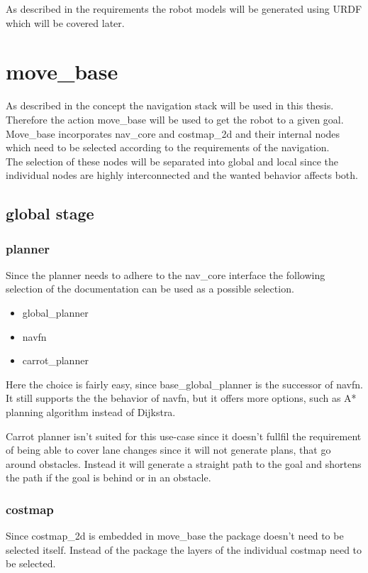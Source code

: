 As described in the requirements the robot models will be generated using URDF which will be covered later.

\section{move\_base}

As described in the concept the navigation stack will be used in this thesis. Therefore the action move\_base will be used to get the robot to a given goal.\\
 Move\_base incorporates nav\_core and costmap\_2d and their internal nodes which need to be selected according to the requirements of the navigation.\\ 
The selection of these nodes will be separated into global and local since the individual nodes are highly interconnected and the wanted behavior affects both.

\subsection{global stage}


\subsubsection{planner}

Since the planner needs to adhere to the nav\_core interface \cite{navcore} the following selection of the documentation can be used as a possible selection.

\begin{itemize}
	\item global\_planner
	\item navfn
	\item carrot\_planner
\end{itemize}


Here the choice is fairly easy, since base\_global\_planner is the successor of navfn. It still supports the the behavior of navfn, but it offers more options, such as A* planning algorithm instead of Dijkstra.


Carrot planner isn't suited for this use-case since it doesn't fullfil the requirement of being able to cover lane changes since it will not generate plans, that go around obstacles. Instead it will generate a straight path to the goal and shortens the path if the goal is behind or in an obstacle\cite{corrotplanner}.

\subsubsection{costmap}
Since costmap\_2d is embedded in move\_base the package doesn't need to be selected itself. Instead of the package the layers of the individual costmap need to be selected.\\

